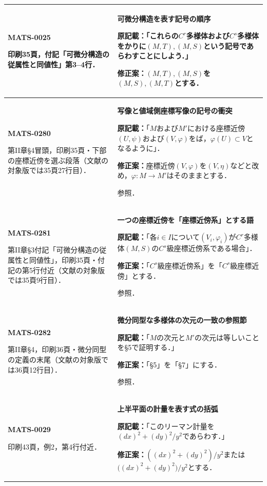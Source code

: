 \documentclass[a4paper,10pt]{ltjsarticle}
\begin{document}
\begin{longtable}{@{}>{\raggedright\arraybackslash}p{.19\linewidth}>{\raggedright\arraybackslash}p{.77\linewidth}@{}}
\hline
\hypertarget{MATS-0025}{}\textbf{MATS-0025}\par 印刷35頁，付記「可微分構造の従属性と同値性」第3--4行． & \textbf{可微分構造を表す記号の順序}\par\textbf{原記載：}「これらの$C^r$多様体および$C^s$多様体をかりに$(M,T),(M,S)$という記号であらわすことにしよう．」\par\textbf{修正案：}$(M,T),(M,S)$を$(M,S),(M,T)$とする． \\[3pt]
\hline
\hypertarget{MATS-0280}{}\textbf{MATS-0280}\par 第II章\S4冒頭，印刷35頁・下部の座標近傍を選ぶ段落（文献\cite{paper2017}の対象版では35頁27行目）． & \textbf{写像と値域側座標写像の記号の衝突}\par\textbf{原記載：}「$M$および$M\prime$における座標近傍$(U,\psi)$および$(V,\varphi)$をば，$\varphi(U)\subset V$となるように」．\par\textbf{修正案：}座標近傍$(V,\varphi)$を$(V,\eta)$などと改め，$\varphi:M\to M\prime$はそのままとする．\par\cite{paper2017}参照． \\[3pt]
\hline
\hypertarget{MATS-0281}{}\textbf{MATS-0281}\par 第II章\S3付記「可微分構造の従属性と同値性」，印刷35頁・付記の第5行付近（文献\cite{paper2017}の対象版では35頁9行目）． & \textbf{一つの座標近傍を「座標近傍系」とする語}\par\textbf{原記載：}「各$i\in I$について$(V_i,\varphi_i)$が$C^r$多様体$(M,S)$の$C^s$級座標近傍系である場合」．\par\textbf{修正案：}「$C^s$級座標近傍系」を「$C^s$級座標近傍」とする．\par\cite{paper2017}参照． \\[3pt]
\hline
\hypertarget{MATS-0282}{}\textbf{MATS-0282}\par 第II章\S4，印刷36頁・微分同型の定義の末尾（文献\cite{paper2017}の対象版では36頁12行目）． & \textbf{微分同型な多様体の次元の一致の参照節}\par\textbf{原記載：}「$M$の次元と$M\prime$の次元は等しいことを\S5で証明する．」\par\textbf{修正案：}「\S5」を「\S7」にする．\par\cite{paper2017}参照． \\[3pt]
\hline
\hypertarget{MATS-0029}{}\textbf{MATS-0029}\par 印刷43頁，例2，第4行付近． & \textbf{上半平面の計量を表す式の括弧}\par\textbf{原記載：}「このリーマン計量を$(dx)^2+(dy)^2/y^2$であらわす．」\par\textbf{修正案：}$((dx)^2+(dy)^2)/y^2$または$\bigl((dx)^2+(dy)^2\bigr)/y^2$とする． \\[3pt]

\end{longtable}
\end{document}
